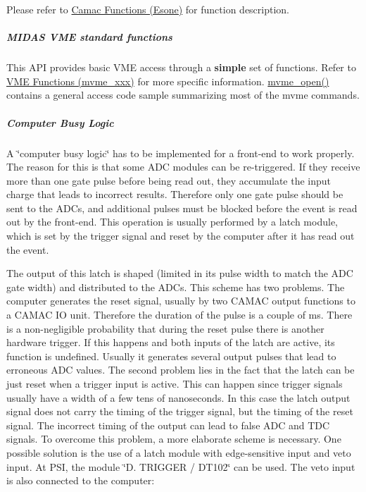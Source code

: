 Please refer to \hyperlink{group__mesonefunctionc}{Camac Functions (Esone)} for function description.

\label{FE_camac_vme_function_calls_idx_hardware_standard_interface_VME}
\hypertarget{FE_camac_vme_function_calls_idx_hardware_standard_interface_VME}{}
 

 \hypertarget{FE_camac_vme_function_calls_FE_Midas_VME_standard_functions}{}\subparagraph{MIDAS VME standard functions}\label{FE_camac_vme_function_calls_FE_Midas_VME_standard_functions}
This API provides basic VME access through a {\bfseries simple} set of functions. Refer to \hyperlink{group__mvmestdfunctionh}{VME Functions (mvme\_\-xxx)} for more specific information. \hyperlink{group__mvmestdfunctionh_ga13db7fc7c7c022e46fadd8fc4dc40047}{mvme\_\-open()} contains a general access code sample summarizing most of the mvme commands.

\label{FE_camac_vme_function_calls_idx_hardware_computer-busy}
\hypertarget{FE_camac_vme_function_calls_idx_hardware_computer-busy}{}
 

 \hypertarget{FE_camac_vme_function_calls_FE_Compute_Busy_Logic}{}\subparagraph{Computer Busy Logic}\label{FE_camac_vme_function_calls_FE_Compute_Busy_Logic}
A \char`\"{}computer busy logic\char`\"{} has to be implemented for a front-\/end to work properly. The reason for this is that some ADC modules can be re-\/triggered. If they receive more than one gate pulse before being read out, they accumulate the input charge that leads to incorrect results. Therefore only one gate pulse should be sent to the ADCs, and additional pulses must be blocked before the event is read out by the front-\/end. This operation is usually performed by a latch module, which is set by the trigger signal and reset by the computer after it has read out the event.

The output of this latch is shaped (limited in its pulse width to match the ADC gate width) and distributed to the ADCs. This scheme has two problems. The computer generates the reset signal, usually by two CAMAC output functions to a CAMAC IO unit. Therefore the duration of the pulse is a couple of ms. There is a non-\/negligible probability that during the reset pulse there is another hardware trigger. If this happens and both inputs of the latch are active, its function is undefined. Usually it generates several output pulses that lead to erroneous ADC values. The second problem lies in the fact that the latch can be just reset when a trigger input is active. This can happen since trigger signals usually have a width of a few tens of nanoseconds. In this case the latch output signal does not carry the timing of the trigger signal, but the timing of the reset signal. The incorrect timing of the output can lead to false ADC and TDC signals. To overcome this problem, a more elaborate scheme is necessary. One possible solution is the use of a latch module with edge-\/sensitive input and veto input. At PSI, the module \char`\"{}D. TRIGGER / DT102\char`\"{} can be used. The veto input is also connected to the computer:

